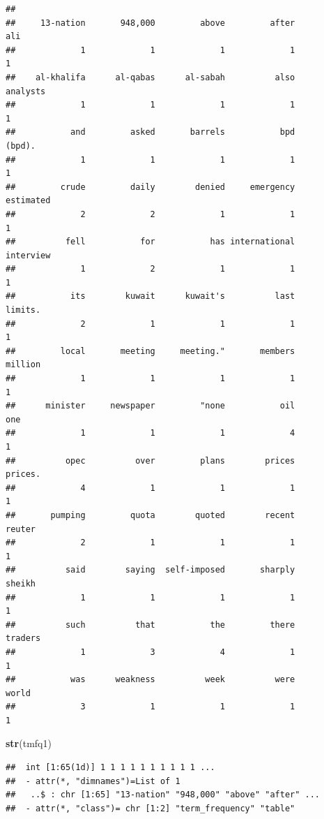 \documentclass[]{book}
\newenvironment{Shaded}{\begin{snugshade}}{\end{snugshade}}
\newcommand{\KeywordTok}[1]{\textcolor[rgb]{0.13,0.29,0.53}{\textbf{{#1}}}}
\newcommand{\NormalTok}[1]{{#1}}
\begin{document}
\begin{verbatim}
## 
##     13-nation       948,000         above         after           ali 
##             1             1             1             1             1 
##    al-khalifa      al-qabas      al-sabah          also      analysts 
##             1             1             1             1             1 
##           and         asked       barrels           bpd        (bpd). 
##             1             1             1             1             1 
##         crude         daily        denied     emergency     estimated 
##             2             2             1             1             1 
##          fell           for           has international     interview 
##             1             2             1             1             1 
##           its        kuwait      kuwait's          last       limits. 
##             2             1             1             1             1 
##         local       meeting     meeting."       members       million 
##             1             1             1             1             1 
##      minister     newspaper         "none           oil           one 
##             1             1             1             4             1 
##          opec          over         plans        prices       prices. 
##             4             1             1             1             1 
##       pumping         quota        quoted        recent        reuter 
##             2             1             1             1             1 
##          said        saying  self-imposed       sharply        sheikh 
##             1             1             1             1             1 
##          such          that           the         there       traders 
##             1             3             4             1             1 
##           was      weakness          week          were         world 
##             3             1             1             1             1
\end{verbatim}

\begin{Shaded}
\begin{Highlighting}[]
\KeywordTok{str}\NormalTok{(tmfq1)}
\end{Highlighting}
\end{Shaded}

\begin{verbatim}
##  int [1:65(1d)] 1 1 1 1 1 1 1 1 1 1 ...
##  - attr(*, "dimnames")=List of 1
##   ..$ : chr [1:65] "13-nation" "948,000" "above" "after" ...
##  - attr(*, "class")= chr [1:2] "term_frequency" "table"
\end{verbatim}
\end{document}
